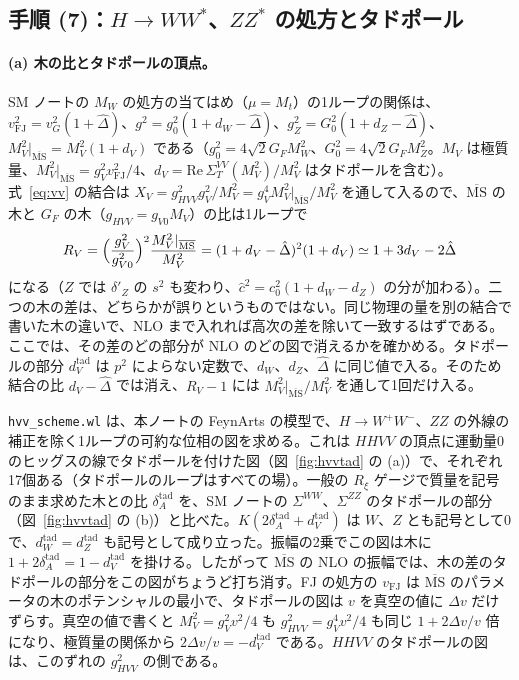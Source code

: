 \documentclass[a4paper,10pt]{ltjsarticle}
\newcommand{\MSbar}{\overline{\mathrm{MS}}}
\begin{document}
\subsection{手順 (7)：$H\to WW^*$、$ZZ^*$ の処方とタドポール}\label{sec:step7}

\paragraph{(a) 木の比とタドポールの頂点。}SM ノートの $M_W$ の処方の当てはめ（$\mu=M_t$）の1ループの関係は、$v_{\mathrm{FJ}}^2=v_G^2(1+\hat\Delta)$、$g^2=g_0^2(1+d_W-\hat\Delta)$、$g_Z^2=G_0^2(1+d_Z-\hat\Delta)$、$M_V^2|_{\MSbar}=M_V^2(1+d_V)$ である（$g_0^2=4\sqrt2G_FM_W^2$、$G_0^2=4\sqrt2G_FM_Z^2$。$M_V$ は極質量、$M_V^2|_{\MSbar}=g_V^2v_{\mathrm{FJ}}^2/4$、$d_V=\mathrm{Re}\,\Sigma_T^{VV}(M_V^2)/M_V^2$ はタドポールを含む）。式~\eqref{eq:vv} の結合は $X_V=g_{HVV}^2g_V^2/M_V^2=g_V^4M_V^2|_{\MSbar}/M_V^2$ を通して入るので、$\MSbar$ の木と $G_F$ の木（$g_{HVV}=g_{V0}M_V$）の比は1ループで
\begin{equation}
R_V=\Bigl(\frac{g_V^2}{g_{V0}^2}\Bigr)^2\frac{M_V^2|_{\MSbar}}{M_V^2}=(1+d_V-\hat\Delta)^2(1+d_V)\simeq1+3d_V-2\hat\Delta
\label{eq:rv}
\end{equation}
になる（$Z$ では $\delta'_Z$ の $s^2$ も変わり、$\hat c^2=c_0^2(1+d_W-d_Z)$ の分が加わる）。二つの木の差は、どちらかが誤りというものではない。同じ物理の量を別の結合で書いた木の違いで、NLO まで入れれば高次の差を除いて一致するはずである。ここでは、その差のどの部分が NLO のどの図で消えるかを確かめる。タドポールの部分 $d_V^{\mathrm{tad}}$ は $p^2$ によらない定数で、$d_W$、$d_Z$、$\hat\Delta$ に同じ値で入る。そのため結合の比 $d_V-\hat\Delta$ では消え、$R_V-1$ には $M_V^2|_{\MSbar}/M_V^2$ を通して1回だけ入る。

\texttt{hvv\_scheme.wl} は、本ノートの FeynArts の模型で、$H\to W^+W^-$、$ZZ$ の外線の補正を除く1ループの可約な位相の図を求める。これは $HHVV$ の頂点に運動量0のヒッグスの線でタドポールを付けた図（図~\ref{fig:hvvtad} の (a)）で、それぞれ17個ある（タドポールのループはすべての場）。一般の $R_\xi$ ゲージで質量を記号のまま求めた木との比 $\delta_A^{\mathrm{tad}}$ を、SM ノートの $\Sigma^{WW}$、$\Sigma^{ZZ}$ のタドポールの部分（図~\ref{fig:hvvtad} の (b)）と比べた。$K(2\delta_A^{\mathrm{tad}}+d_V^{\mathrm{tad}})$ は $W$、$Z$ とも記号として0で、$d_W^{\mathrm{tad}}=d_Z^{\mathrm{tad}}$ も記号として成り立った。振幅の2乗でこの図は木に $1+2\delta_A^{\mathrm{tad}}=1-d_V^{\mathrm{tad}}$ を掛ける。したがって $\MSbar$ の NLO の振幅では、木の差のタドポールの部分をこの図がちょうど打ち消す。FJ の処方の $v_{\mathrm{FJ}}$ は $\MSbar$ のパラメータの木のポテンシャルの最小で、タドポールの図は $v$ を真空の値に $\Delta v$ だけずらす。真空の値で書くと $M_V^2=g_V^2v^2/4$ も $g_{HVV}^2=g_V^4v^2/4$ も同じ $1+2\Delta v/v$ 倍になり、極質量の関係から $2\Delta v/v=-d_V^{\mathrm{tad}}$ である。$HHVV$ のタドポールの図は、このずれの $g_{HVV}^2$ の側である。
\end{document}

